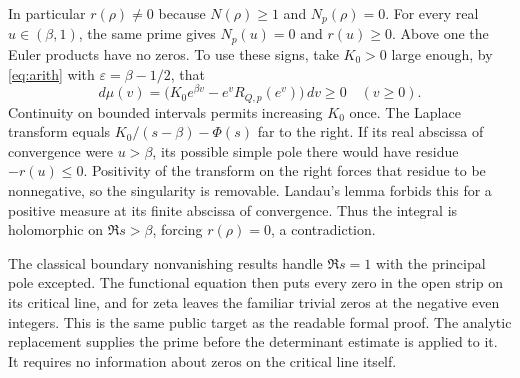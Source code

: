 \documentclass[11pt,letterpaper]{article}
\newcommand{\e}{\varepsilon}
\begin{document}
In particular $r(\rho)\ne0$ because $N(\rho)\ge1$ and $N_p(\rho)=0$. For every real $u\in(\beta,1)$, the same prime gives $N_p(u)=0$ and $r(u)\ge0$. Above one the Euler products have no zeros. To use these signs, take $K_0>0$ large enough, by \eqref{eq:arith} with $\e=\beta-1/2$, that
\[
 d\mu(v)=\bigl(K_0e^{\beta v}-e^v R_{Q,p}(e^v)\bigr)\,dv\ge0
       \quad (v\ge0).
\]
Continuity on bounded intervals permits increasing $K_0$ once. The Laplace transform equals $K_0/(s-\beta)-\Phi(s)$ far to the right. If its real abscissa of convergence were $u>\beta$, its possible simple pole there would have residue $-r(u)\le0$. Positivity of the transform on the right forces that residue to be nonnegative, so the singularity is removable. Landau's lemma forbids this for a positive measure at its finite abscissa of convergence. Thus the integral is holomorphic on $\Re s>\beta$, forcing $r(\rho)=0$, a contradiction.

The classical boundary nonvanishing results handle $\Re s=1$ with the principal pole excepted. The functional equation then puts every zero in the open strip on its critical line, and for zeta leaves the familiar trivial zeros at the negative even integers. This is the same public target as the readable formal proof. The analytic replacement supplies the prime before the determinant estimate is applied to it. It requires no information about zeros on the critical line itself.

\clearpage

\clearpage


\clearpage
\end{document}

